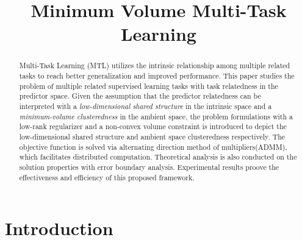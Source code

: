 \documentclass{article}
\newcounter{lem_counter}
\newcounter{pro_counter}
\newcounter{ass_counter}
\begin{document}

\title{\Large Minimum Volume Multi-Task Learning}
\date{}

\maketitle

 

\begin{abstract} \small\baselineskip=9pt 

Multi-Task Learning (MTL) utilizes the intrinsic relationship among
multiple related tasks to reach better generalization and improved
performance. This paper studies the problem of multiple related
supervised learning tasks with task relatedness in the predictor space.
Given the assumption that the predictor relatedness can be interpreted with a
\emph{low-dimensional shared structure} in the intrinsic space
and a \emph{minimum-volume clusteredness} in the ambient space, the problem
formulations with a low-rank regularizer and a non-convex volume constraint
is introduced to depict the low-dimensional shared structure and ambient space
clusteredness respectively. The objective function is solved via alternating
direction method of multipliers(ADMM), which facilitates distributed computation.
Theoretical analysis is also conducted on the solution properties with error boundary
 analysis. Experimental results proove the effectiveness and efficiency of
this proposed framework.

\end{abstract}



\section{Introduction}
\end{document}

